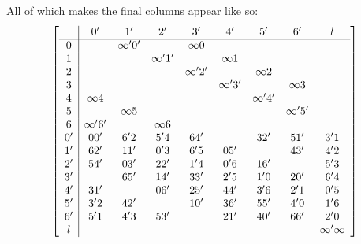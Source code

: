 \begin{example}
All of which makes the final columns appear like so:
\begin{equation}
  \left[\begin{array}{c|*{8}c}
       &        0'      &       1'       &      2'       &      3'      &        4'       &       5'       &       6'       &         l  \\ \hline
    0  &                &   \infty ' 0'  &               &   \infty 0   &                 &                &                &            \\ 
    1  &                &                &  \infty ' 1'  &              &     \infty 1    &                &                &            \\
    2  &                &                &               &  \infty ' 2' &                 &    \infty 2    &                &            \\
    3  &                &                &               &              &   \infty ' 3 '  &                &    \infty 3    &            \\ 
    4  &    \infty  4   &                &               &              &                 &  \infty ' 4 '  &                &            \\
    5  &                &   \infty  5    &               &              &                 &                &  \infty ' 5 '  &            \\
    6  &   \infty ' 6 ' &                &   \infty 6    &              &                 &                &                &            \\
    0' &       00'      &       6'2      &      5'4      &      64'     &                 &      32'       &      51'        &       3'1 \\
    1' &       62'      &       11'      &      0'3      &      6'5     &       05'       &                &      43'        &       4'2 \\
    2' &       54'      &       03'      &      22'      &      1'4     &       0'6       &      16'       &                 &       5'3 \\
    3' &                &       65'      &      14'      &      33'     &       2'5       &      1'0       &      20'        &       6'4 \\
    4' &       31'      &                &      06'      &      25'     &       44'       &      3'6       &      2'1        &       0'5 \\
    5' &       3'2      &       42'      &               &      10'     &       36'       &      55'       &      4'0        &       1'6 \\
    6' &       5'1      &       4'3      &      53'      &              &       21'       &      40'       &      66'        &    2'0     \\
    l  &                &                &               &              &                 &                &                 & \infty ' \infty \\ 
  \end{array}\right]
\end{equation}


\end{example}
